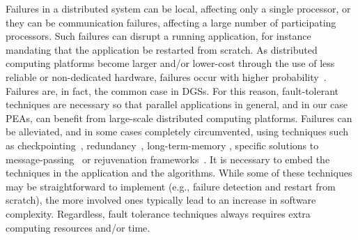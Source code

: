 \documentclass[graybox]{sty/svmult}
\begin{document}
Failures in a distributed system can be local, affecting only a single processor, or they can be
communication failures, affecting a large number of participating
processors.  Such failures can disrupt a running application,
for instance mandating that the application be restarted from scratch.  
As distributed computing platforms become larger
and/or lower-cost through the use of less reliable or non-dedicated hardware, 
failures occur with higher probability~\cite{hardware-failures,hardware-reliability-cost,hardware-reliability}. Failures are, in fact, the common case in
DGSs.  For this reason, fault-tolerant techniques are necessary so that
parallel applications in general, and in our case PEAs, can benefit
from large-scale distributed computing platforms.  Failures can
be alleviated, and in some cases completely circumvented, using
techniques such as checkpointing~\cite{biblia-checkpointing},
redundancy~\cite{primary_backup}, long-term-memory 
\cite{epidemic-algorithms-fault-tolerance-dream}, specific solutions
to message-passing~\cite{starfish-fault-tolerant} or rejuvenation
frameworks~\cite{rejuvenation}. 
It is necessary to embed the techniques in the application and the
algorithms. While some of these techniques may be straightforward to
implement (e.g., failure detection and restart from scratch), the more
involved ones typically lead to an increase in software complexity.  Regardless,
fault tolerance techniques always requires extra computing
resources and/or time.
\end{document}
